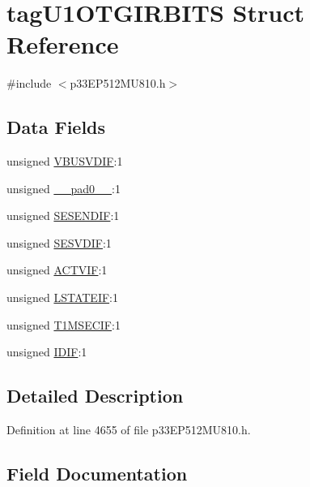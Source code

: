 \hypertarget{structtag_u1_o_t_g_i_r_b_i_t_s}{}\section{tag\+U1\+O\+T\+G\+I\+R\+B\+I\+TS Struct Reference}
\label{structtag_u1_o_t_g_i_r_b_i_t_s}


{\ttfamily \#include $<$p33\+E\+P512\+M\+U810.\+h$>$}

\subsection*{Data Fields}
\begin{DoxyCompactItemize}
\item 
unsigned \hyperlink{structtag_u1_o_t_g_i_r_b_i_t_s_af4c95445eb3d90765ad709ca1a6f9d59}{V\+B\+U\+S\+V\+D\+IF}\+:1
\item 
unsigned \hyperlink{structtag_u1_o_t_g_i_r_b_i_t_s_adf71f3d8410c1f1dbbc96680a92c49af}{\+\_\+\+\_\+pad0\+\_\+\+\_\+}\+:1
\item 
unsigned \hyperlink{structtag_u1_o_t_g_i_r_b_i_t_s_a6a7e37194e602d7e9f900de9e118b7fb}{S\+E\+S\+E\+N\+D\+IF}\+:1
\item 
unsigned \hyperlink{structtag_u1_o_t_g_i_r_b_i_t_s_a5bb1f979985c5a05c50038f25c1454ef}{S\+E\+S\+V\+D\+IF}\+:1
\item 
unsigned \hyperlink{structtag_u1_o_t_g_i_r_b_i_t_s_ae50a014a4a264b118b58a7046af8403e}{A\+C\+T\+V\+IF}\+:1
\item 
unsigned \hyperlink{structtag_u1_o_t_g_i_r_b_i_t_s_a1a3bfb3321fa22099c792a8d62597555}{L\+S\+T\+A\+T\+E\+IF}\+:1
\item 
unsigned \hyperlink{structtag_u1_o_t_g_i_r_b_i_t_s_aa071ced30323cf715a57e9c4bf35984b}{T1\+M\+S\+E\+C\+IF}\+:1
\item 
unsigned \hyperlink{structtag_u1_o_t_g_i_r_b_i_t_s_a3c410ada51aeecdc1a8fa0af6c1cc845}{I\+D\+IF}\+:1
\end{DoxyCompactItemize}


\subsection{Detailed Description}


Definition at line 4655 of file p33\+E\+P512\+M\+U810.\+h.



\subsection{Field Documentation}
\mbox{\label{structtag_u1_o_t_g_i_r_b_i_t_s_adf71f3d8410c1f1dbbc96680a92c49af}} 
